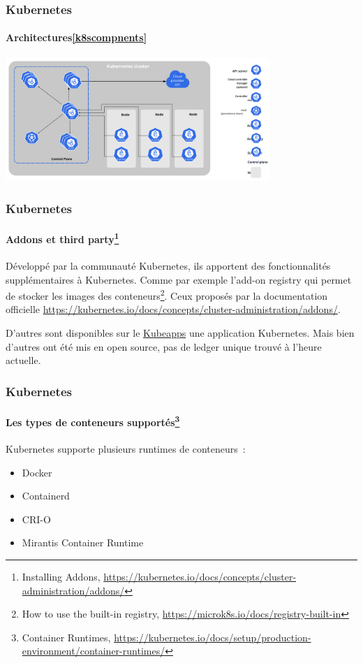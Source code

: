 \documentclass{beamer}
\begin{document}
    \begin{frame}
        \transdissolve
        \frametitle{Kubernetes}
        \framesubtitle{Architectures\cref{k8scompnents}}
        \centering
        \includegraphics[width=10cm]{image/components-of-kubernetes}
    \end{frame}

    \begin{frame}
        \transdissolve
        \frametitle{Kubernetes}
        \framesubtitle{Addons et third party\footnote{Installing Addons, \url{https://kubernetes.io/docs/concepts/cluster-administration/addons/}}}
        Développé par la communauté Kubernetes, ils apportent des fonctionnalités supplémentaires à Kubernetes.
        Comme par exemple l'add-on registry qui permet de stocker les images des conteneurs\footnote{How to use the built-in registry, \url{https://microk8s.io/docs/registry-built-in}}.
        \bigbreak
        Ceux proposés par la documentation officielle \url{https://kubernetes.io/docs/concepts/cluster-administration/addons/}.

        D'autres sont disponibles sur le \href{https://hub.kubeapps.com/}{Kubeapps} une application Kubernetes.
        \bigbreak
        Mais bien d'autres ont été mis en open source, pas de ledger unique trouvé à l'heure actuelle.
    \end{frame}

    \begin{frame}
        \transdissolve
        \frametitle{Kubernetes}
        \framesubtitle{Les types de conteneurs supportés\footnote{Container Runtimes, \url{https://kubernetes.io/docs/setup/production-environment/container-runtimes/}}}
        Kubernetes supporte plusieurs runtimes de conteneurs~:
        \begin{itemize}
            \item Docker
            \item Containerd
            \item CRI-O
            \item Mirantis Container Runtime
        \end{itemize}
    \end{frame}
\end{document}

